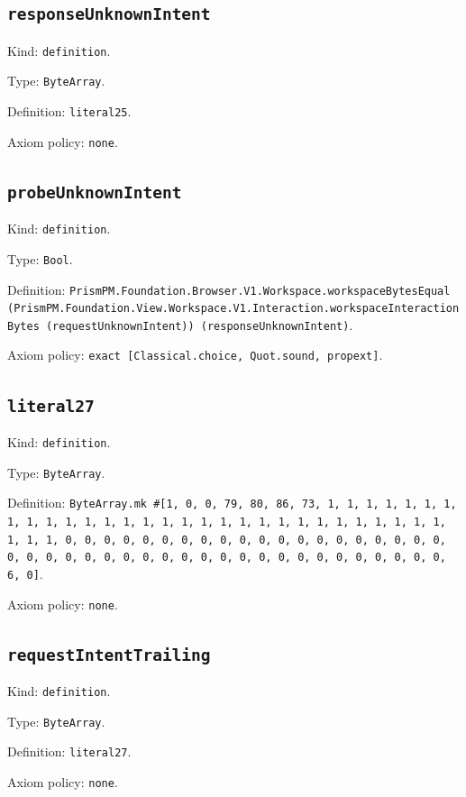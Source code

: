 \documentclass[11pt]{article}
\begin{document}
\subsection*{\texttt{responseUnknownIntent}}
\noindent Kind: \texttt{definition}.\par
\noindent Type: \texttt{ByteArray}.\par
\noindent Definition: \texttt{literal25}.\par
\noindent Axiom policy: \texttt{none}.\par
\subsection*{\texttt{probeUnknownIntent}}
\noindent Kind: \texttt{definition}.\par
\noindent Type: \texttt{Bool}.\par
\noindent Definition: \texttt{PrismPM.Foundation.Browser.V1.Workspace.workspaceBytesEqual (PrismPM.Foundation.View.Workspace.V1.Interaction.workspaceInteractionBytes (requestUnknownIntent)) (responseUnknownIntent)}.\par
\noindent Axiom policy: \texttt{exact [Classical.choice, Quot.sound, propext]}.\par
\subsection*{\texttt{literal27}}
\noindent Kind: \texttt{definition}.\par
\noindent Type: \texttt{ByteArray}.\par
\noindent Definition: \texttt{ByteArray.mk \#[1, 0, 0, 79, 80, 86, 73, 1, 1, 1, 1, 1, 1, 1, 1, 1, 1, 1, 1, 1, 1, 1, 1, 1, 1, 1, 1, 1, 1, 1, 1, 1, 1, 1, 1, 1, 1, 1, 1, 1, 0, 0, 0, 0, 0, 0, 0, 0, 0, 0, 0, 0, 0, 0, 0, 0, 0, 0, 0, 0, 0, 0, 0, 0, 0, 0, 0, 0, 0, 0, 0, 0, 0, 0, 0, 0, 0, 0, 0, 0, 0, 0, 0, 6, 0]}.\par
\noindent Axiom policy: \texttt{none}.\par
\subsection*{\texttt{requestIntentTrailing}}
\noindent Kind: \texttt{definition}.\par
\noindent Type: \texttt{ByteArray}.\par
\noindent Definition: \texttt{literal27}.\par
\noindent Axiom policy: \texttt{none}.\par
\end{document}
